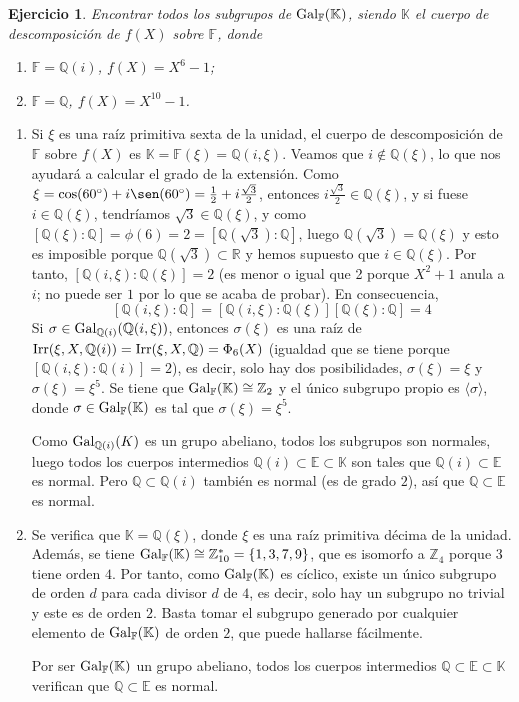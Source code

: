 \documentclass[11pt]{report}
\makeatletter
\renewenvironment{proof}[1][\proofname]{\par
  \pushQED{\qed}%
  \normalfont \topsep\z@skip %
  \trivlist
  \item[\hskip\labelsep
        \itshape
    #1\@addpunct{.}]\ignorespaces
}{%
  \popQED\endtrivlist\@endpefalse
}
\newcommand{\R}{\mathbb R}
\newcommand{\Z}{\mathbb Z}
\newcommand{\Q}{\mathbb Q}
\newcommand{\F}{\mathbb F}
\newcommand{\E}{\mathbb E}
\newcommand{\K}{\mathbb K}
\newtheorem{ejercicio}{Ejercicio}
\makeatother
\begin{document}
\begin{ejercicio}
Encontrar todos los subgrupos de $\textup{Gal}_\F(\K)$, siendo $\K$ el cuerpo de descomposición de $f(X)$ sobre $\F$, donde
\begin{enumerate}
    \item $\F= \Q(i)$, $f(X)=X^6-1$;
    \item $\F=\Q$, $f(X)=X^{10}-1$.
\end{enumerate}
\end{ejercicio}

\begin{proof}
    \hfill
    \begin{enumerate}
        \item Si $\xi$ es una raíz primitiva sexta de la unidad, el cuerpo de descomposición de $\F$ sobre $f(X)$ es $\K = \F(\xi) = \Q(i,\xi)$. Veamos que $i \not\in \Q(\xi)$, lo que nos ayudará a calcular el grado de la extensión. Como $\xi = \cos(60^\circ)+i\sen(60^\circ) = \frac{1}{2}+i\frac{\sqrt{3}}{2}$, entonces $i\frac{\sqrt{3}}{2} \in \Q(\xi)$, y si fuese $i \in \Q(\xi)$, tendríamos $\sqrt{3} \in \Q(\xi)$, y como $[\Q(\xi) \colon \Q] =\phi(6)=2 = [\Q(\sqrt{3}) \colon \Q]$, luego $\Q(\sqrt{3}) = \Q(\xi)$ y esto es imposible porque $\Q(\sqrt{3}) \subset \R$ y hemos supuesto que $i \in \Q(\xi)$. Por tanto, $[\Q(i,\xi) \colon \Q(\xi)] = 2$ (es menor o igual que 2 porque $X^2+1$ anula a $i$; no puede ser $1$ por lo que se acaba de probar). En consecuencia,
        \[[\Q(i,\xi) \colon \Q] = [\Q(i,\xi) \colon \Q(\xi)] [\Q(\xi) \colon \Q] = 4\]
        Si $\sigma \in \textup{Gal}_{\Q(i)}(\Q(i,\xi))$, entonces $\sigma(\xi)$ es una raíz de $\textup{Irr}(\xi,X,\Q(i)) = \textup{Irr}(\xi,X,\Q) = \Phi_6(X)$ (igualdad que se tiene porque $[\Q(i,\xi) \colon \Q(i)] = 2$), es decir, solo hay dos posibilidades, $\sigma(\xi) = \xi$ y $\sigma(\xi) = \xi^5$. Se tiene que $\textup{Gal}_\F(\K) \cong \Z_2$ y el único subgrupo propio es $\langle \sigma \rangle$, donde $\sigma \in \textup{Gal}_\F(\K)$ es tal que $\sigma(\xi) = \xi^5$.

        Como $\textup{Gal}_{\Q(i)}(K)$ es un grupo abeliano, todos los subgrupos son normales, luego todos los cuerpos intermedios $\Q(i) \subset \E \subset \K$ son tales que $\Q(i) \subset \E$ es normal. Pero $\Q \subset \Q(i)$ también es normal (es de grado $2$), así que $\Q \subset \E$ es normal.
        \item Se verifica que $\K = \Q(\xi)$, donde $\xi$ es una raíz primitiva décima de la unidad. Además, se tiene $\textup{Gal}_\F(\K) \cong \Z_{10}^* = \{1,3,7,9\}$, que es isomorfo a $\Z_4$ porque $3$ tiene orden $4$. Por tanto, como $\textup{Gal}_\F(\K)$ es cíclico, existe un único subgrupo de orden $d$ para cada divisor $d$ de $4$, es decir, solo hay un subgrupo no trivial y este es de orden $2$. Basta tomar el subgrupo generado por cualquier elemento de $\textup{Gal}_\F(\K)$ de orden $2$, que puede hallarse fácilmente.
        
        Por ser $\textup{Gal}_\F(\K)$ un grupo abeliano, todos los cuerpos intermedios $\Q \subset \E \subset \K$ verifican que $\Q \subset \E$ es normal. \qedhere
    \end{enumerate}
\end{proof}
\end{document}
